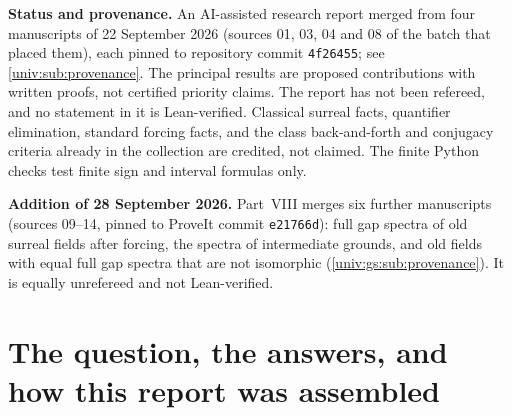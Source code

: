 \documentclass[11pt,letterpaper]{article}
\numberwithin{equation}{section}
\theoremstyle{definition}
\theoremstyle{remark}
\newcommand{\No}{\mathbf{No}}
\newcommand{\NoM}{\No^{M}}
\newcommand{\NoN}{\No^{N}}
\newcommand{\cf}{\operatorname{cf}}
\newcommand{\Add}{\operatorname{Add}}
\newcommand{\shorthash}{\texttt{4f26455}}
\newcommand{\gspin}{\texttt{e21766d}}
\begin{document}
\begin{titlepage}
\begin{minipage}{0.94\textwidth}
\begin{abstract}
Every gap of $\NoM$ with set-sized cofinal and coinitial witnesses comes from a
unique fresh sign, a new sign sequence all of whose proper prefixes are old.
Its fillers are exactly the sign extensions of that fresh sign, and every
such gap is symmetric. The first new birthday $\beta$ satisfies
$\delta\le\cf^N\beta\le\beta$. At the countable boundary, $\omega$-saturation
detects exactly the new reals. The pure field $\NoM[i]$ stays saturated over
every $N$-set, while naming conjugation restores the real spectrum. The old
field is closed and nowhere dense in $\NoN$, and each $N$-set of old numbers is
uniformly discrete. We also treat bounded birthday fragments and the Cohen,
$\Add(\kappa,1)$ and Prikry extensions. Under Global Choice, we give
nonconjugate real forms of $\NoN[i]$ none of which has a set-sized cofinal
subset. Finally we give a set-complete class Boolean algebra in which reverse
simplicity is dense; class-completeness is impossible under Global Choice.
\end{abstract}
\end{minipage}
\vfill
\begin{minipage}{0.94\textwidth}\small
\textbf{Status and provenance.} An AI-assisted research report merged from
four manuscripts of 22 September 2026 (sources 01, 03, 04 and 08 of the batch
that placed them), each pinned to repository commit \shorthash; see
\cref{univ:sub:provenance}. The principal results are proposed contributions
with written proofs, not certified priority claims. The report has not been
refereed, and no statement in it is Lean-verified. Classical surreal facts,
quantifier elimination, standard forcing facts, and the class back-and-forth
and conjugacy criteria already in the collection are credited, not claimed.
The finite Python checks test finite sign and interval formulas only.

\textbf{Addition of 28 September 2026.} Part~VIII merges six further
manuscripts (sources 09--14, pinned to ProveIt commit \gspin): full gap
spectra of old surreal fields after forcing, the spectra of intermediate
grounds, and old fields with equal full gap spectra that are not isomorphic
(\cref{univ:gs:sub:provenance}). It is equally unrefereed and not Lean-verified.
\end{minipage}
\end{titlepage}
\hypersetup{pageanchor=true}
\setcounter{tocdepth}{2}
{\small\setlength{\parskip}{0pt}\tableofcontents}
\clearpage
{}

\section{The question, the answers, and how this report was assembled}\label{univ:sec:overview}
\end{document}
